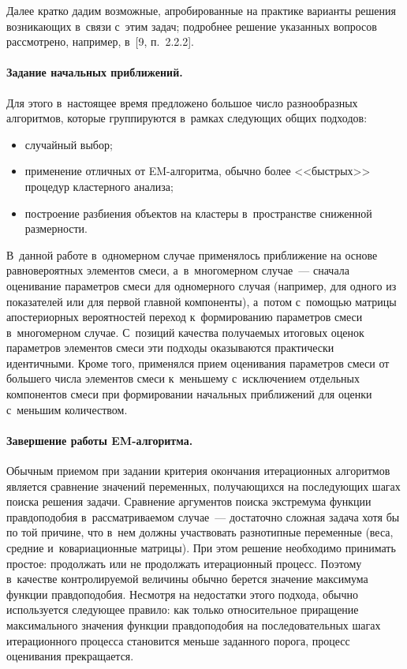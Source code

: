 \begin{multicols}{2}
     Далее кратко дадим возможные, апробированные на
практике варианты решения возникающих в~связи с~этим задач; подробнее
решение указанных вопросов рассмотрено, например, в~[9, п.~2.2.2].

     \paragraph*{Задание начальных приближений.} Для этого в~настоящее
время предложено большое число разнообразных алгоритмов, которые
группируются в~рамках следующих общих подходов:
\begin{itemize}
\item случайный выбор;
\item применение отличных от EM-ал\-го\-рит\-ма, обычно более <<быстрых>>
процедур кластерного анализа;
\item построение разбиения объектов на кластеры в~пространстве сниженной
размерности.
\end{itemize}

В~данной работе в~одномерном случае
применялось приближение на основе равновероятных элементов смеси,
а~в~многомерном случае~--- сначала оценивание параметров смеси для
одномерного случая (например, для одного из показателей или для первой
главной компоненты), а~потом с~по\-мощью матрицы апостериорных
вероятностей переход к~формированию параметров смеси в~многомерном
случае. С~позиций качества получаемых итоговых оценок параметров
элементов смеси эти подходы оказываются практически идентичными. Кроме
того, применялся прием оценивания параметров смеси от большего числа
элементов смеси к~меньшему с~исключением отдельных компонентов смеси
при формировании начальных приближений для оценки с~меньшим
количеством.

     \paragraph*{Завершение работы EM-алгоритма.} Обычным при\-емом
при задании критерия окончания итерационных алгоритмов является сравнение
значений переменных, получающихся на последующих шагах поиска решения
задачи. Сравнение аргументов поиска экстремума функции правдоподобия
в~рассматриваемом случае~--- достаточно сложная задача хотя бы по той причине,
что в~нем должны участвовать разнотипные переменные (веса, средние и~ковариационные матрицы). При этом решение необходимо принимать простое:
продолжать или не продолжать итерационный процесс. Поэтому в~качестве
контролируемой величины обычно берется значение максимума функции
правдоподобия. Несмотря на недостатки этого подхода, обычно используется
следующее правило: как только относительное приращение максимального
значения функции правдоподобия на последовательных шагах итерационного
процесса становится меньше заданного порога, процесс оценивания
прекращается.


\end{multicols}
